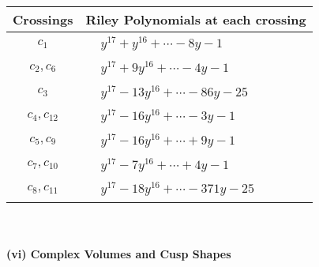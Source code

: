 \documentclass[1p]{elsarticle_modified}
\theoremstyle{definition}
\begin{document}
\begin{tabular}{m{50pt}|m{274pt}}
Crossings & \hspace{64pt}Riley Polynomials at each crossing \\
\hline $$\begin{aligned}c_{1}\end{aligned}$$&$\begin{aligned}
&y^{17}+y^{16}+\cdots-8 y-1
\end{aligned}$\\
\hline $$\begin{aligned}c_{2},c_{6}\end{aligned}$$&$\begin{aligned}
&y^{17}+9 y^{16}+\cdots-4 y-1
\end{aligned}$\\
\hline $$\begin{aligned}c_{3}\end{aligned}$$&$\begin{aligned}
&y^{17}-13 y^{16}+\cdots-86 y-25
\end{aligned}$\\
\hline $$\begin{aligned}c_{4},c_{12}\end{aligned}$$&$\begin{aligned}
&y^{17}-16 y^{16}+\cdots-3 y-1
\end{aligned}$\\
\hline $$\begin{aligned}c_{5},c_{9}\end{aligned}$$&$\begin{aligned}
&y^{17}-16 y^{16}+\cdots+9 y-1
\end{aligned}$\\
\hline $$\begin{aligned}c_{7},c_{10}\end{aligned}$$&$\begin{aligned}
&y^{17}-7 y^{16}+\cdots+4 y-1
\end{aligned}$\\
\hline $$\begin{aligned}c_{8},c_{11}\end{aligned}$$&$\begin{aligned}
&y^{17}-18 y^{16}+\cdots-371 y-25
\end{aligned}$\\
\hline
\end{tabular}\\~\\
\newpage\flushleft \textbf{(vi) Complex Volumes and Cusp Shapes}
\end{document}
